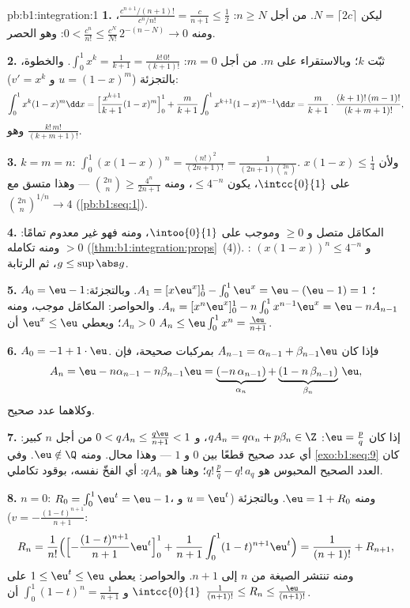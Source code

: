 \begin{solution}{pb:b1:integration:1}
\textbf{1.} ليكن $N = \lceil 2c \rceil$. من أجل $n \geq N$:
$\frac{c^{n+1}/(n+1)!}{c^n/n!} = \frac{c}{n+1} \leq \frac12$، ومنه
$0 < \frac{c^n}{n!} \leq \frac{c^N}{N!}\,2^{-(n - N)} \to 0$:
وهو الحصر.

\textbf{2.} ثبّت $k$؛ وبالاستقراء على $m$. من أجل $m = 0$: $\int_0^1
x^k = \frac{1}{k+1} = \frac{k!\,0!}{(k+1)!}$. والخطوة، بالتجزئة
($u = (1-x)^m$ و $v' = x^k$):
\[
\int_0^1 x^k (1-x)^m \dd x
= \Bigl[\frac{x^{k+1}}{k+1}(1-x)^m\Bigr]_0^1
+ \frac{m}{k+1}\int_0^1 x^{k+1}(1-x)^{m-1}\dd x
= \frac{m}{k+1}\cdot\frac{(k+1)!\,(m-1)!}{(k+m+1)!} ,
\]
وهو $\frac{k!\,m!}{(k+m+1)!}$.

\textbf{3.} $k = m = n$: $\int_0^1 (x(1-x))^n =
\frac{(n!)^2}{(2n+1)!} = \frac{1}{(2n+1)\binom{2n}{n}}$. ولأن
$x(1-x) \leq \frac14$ على $\intcc{0}{1}$، يكون  $\leq
4^{-n}$، ومنه $\binom{2n}{n} \geq \frac{4^n}{2n+1}$ ---
وهذا متسق مع $\binom{2n}{n}^{1/n} \to 4$
(\cref{pb:b1:seq:1}).

\textbf{4.} المكامَل متصل و $\geq 0$ وموجب
على $\intoo{0}{1}$، ومنه فهو غير معدوم تمامًا: ومنه تكامله
$> 0$ (\cref{thm:b1:integration:props}~(4)). :
$(x(1-x))^n \leq 4^{-n}$ و $g \leq \sup\abs g$، ثم
الرتابة.

\textbf{5.} $A_0 = \eu - 1$؛ $A_1 = [x\eu^x]_0^1 - \int_0^1
\eu^x = \eu - (\eu - 1) = 1$. وبالتجزئة: $A_n = [x^n \eu^x]_0^1 -
n\int_0^1 x^{n-1}\eu^x = \eu - n A_{n-1}$. والحواصر: المكامَل
موجب، ومنه $A_n > 0$؛ ويعطي $\eu^x \leq \eu$ أن $A_n \leq
\eu\int_0^1 x^n = \frac{\eu}{n+1}$.

\textbf{6.} $A_0 = -1 + 1\cdot\eu$. فإذا كان $A_{n-1} = \alpha_{n-1} +
\beta_{n-1}\eu$ بمركبات صحيحة، فإن
\[
A_n = \eu - n\alpha_{n-1} - n\beta_{n-1}\eu
= \underbrace{(-n\,\alpha_{n-1})}_{\alpha_n}
+ \underbrace{(1 - n\,\beta_{n-1})}_{\beta_n}\,\eu ,
\]
وكلاهما عدد صحيح.

\textbf{7.} إذا كان $\eu = \frac pq$: $q A_n = q\alpha_n + p\beta_n
\in \Z$، و $0 < qA_n \leq \frac{q\eu}{n+1} < 1$ من أجل $n$ كبير:
أي عدد صحيح قطعًا بين $0$ و $1$ --- وهذا محال. ومنه $\eu
\notin \Q$. وفي \cref{exo:b1:seq:9} كان العدد الصحيح المحبوس هو
$q!\,\frac pq - q!\,a_q$؛ وهنا هو $qA_n$: أي الفخّ نفسه،
بوقود تكاملي.

\textbf{8.} $n = 0$: $R_0 = \int_0^1 \eu^t = \eu - 1$، ومنه $\eu =
1 + R_0$. وبالتجزئة ($u = \eu^t$ و $v = -\frac{(1-t)^{n+1}}{n+1}$):
\[
R_n = \frac{1}{n!}\Bigl(\Bigl[-\frac{(1-t)^{n+1}}{n+1}
\eu^t\Bigr]_0^1 + \frac{1}{n+1}\int_0^1 (1-t)^{n+1}\eu^t\Bigr)
= \frac{1}{(n+1)!} + R_{n+1} ,
\]
ومنه تنتشر الصيغة من $n$ إلى $n + 1$. والحواصر: يعطي $1 \leq
\eu^t \leq \eu$ على $\intcc{0}{1}$ و $\int_0^1 (1-t)^n =
\frac{1}{n+1}$ أن $\frac{1}{(n+1)!} \leq R_n \leq
\frac{\eu}{(n+1)!}$.


\end{solution}
